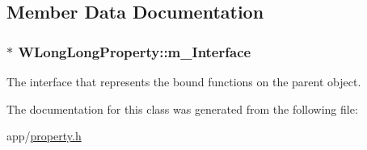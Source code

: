\subsection{Member Data Documentation}
\hypertarget{class_w_long_long_property_ae6b2b015e81593744f2ef962aa7c04b6}{
\subsubsection[{m\-\_\-\-Interface}]{$\ast$ W\-Long\-Long\-Property\-::m\-\_\-\-Interface\hspace{0.3cm}{\ttfamily [protected]}}}\label{class_w_long_long_property_ae6b2b015e81593744f2ef962aa7c04b6}
The interface that represents the bound functions on the parent object. 

The documentation for this class was generated from the following file\-:\begin{DoxyCompactItemize}
\item 
app/\hyperlink{property_8h}{property.\-h}\end{DoxyCompactItemize}
